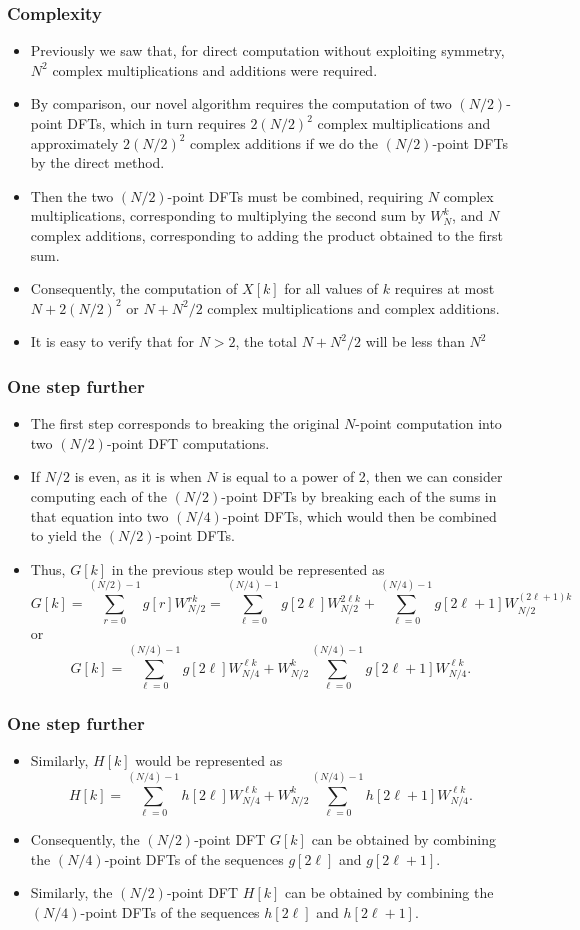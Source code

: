 \begin{frame}
\frametitle{Complexity}
\begin{itemize}
\item Previously we saw that, for direct computation without exploiting symmetry, $N^{2}$ complex multiplications and additions were required.
\item By comparison, our novel algorithm requires the computation of two $(N/2)$-point DFTs, which in turn requires $2(N/2)^{2}$ complex multiplications and approximately $2(N/2)^{2}$ complex additions if we do the $(N/2)$-point DFTs by the direct method. 
\item Then the two $(N/2)$-point DFTs must be combined, requiring $N$ complex multiplications, corresponding to multiplying the second sum by $W_{N}^{k}$, and $N$ complex additions, corresponding to adding the product obtained to the first sum. 
\item Consequently, the computation of $X[k]$ for all values of $k$ requires at most $N+2(N/2)^{2}$ or $N+N^{2}/2$ complex multiplications and complex additions. 
\item It is easy to verify that for $N>2$, the total $N+N^{2}/2$ will be less than $N^{2}$
\end{itemize}
\end{frame}

\begin{frame}
\frametitle{One step further}
\begin{itemize}
\item The first step corresponds to breaking the original $N$-point computation into two $(N/2)$-point DFT computations. 
\item If $N/2$ is even, as it is when $N$ is equal to a power of 2, then we can consider computing each of the $(N/2)$-point DFTs  by breaking each of the sums in that equation into two $(N/4)$-point DFTs, which would then be combined to yield the $(N/2)$-point DFTs. 
\item Thus, $G[k]$ in the previous step  would be represented as
$$
G[k]= \sum_{r=0}^{(N/2)-1}g[r]W_{N/2}^{rk}=\sum_{\ell=0}^{(N/4)-1}g[2\ell]W_{N/2}^{2\ell k}+\sum_{\ell=0}^{(N/4)-1}g[2\ell+1]W_{N/2}^{(2\ell+1) k}
$$
or
$$
G[k]=\sum_{\ell=0}^{(N/4)-1}g[2\ell]W_{N/4}^{\ell k}+W_{N/2}^{k}\sum_{\ell=0}^{(N/4)-1}g[2\ell+1]W_{N/4}^{\ell k}.
$$
\end{itemize}
\end{frame}

\begin{frame}
\frametitle{One step further}
\begin{itemize}
\item Similarly, $H[k]$ would be represented as
$$
H[k]=\sum_{\ell=0}^{(N/4)-1}h[2\ell]W_{N/4}^{\ell k}+W_{N/2}^{k}\sum_{\ell=0}^{(N/4)-1}h[2\ell+1]W_{N/4}^{\ell k}.
$$
\item Consequently, the $(N/2)$-point DFT $G[k]$ can be obtained by combining the $(N/4)$-point DFTs of the sequences $g[2\ell]$ and $g[2\ell+1]$.
\item Similarly, the $(N/2)$-point DFT $H[k]$ can be obtained by combining the $(N/4)$-point DFTs of the sequences $h[2\ell]$ and $h[2\ell+1]$.
\end{itemize}
\end{frame}

